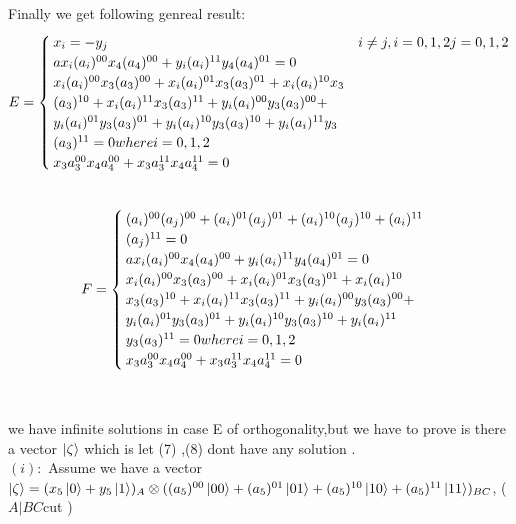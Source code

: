 \documentclass[a4paper,12pt]{article}
\begin{document}
Finally we get following genreal result:
\begin{equation}
E = \begin{cases}
x_{i}=-y_{j}        &  i\neq j   ,i=0,1,2   j=0,1,2\\
a x_{i}(a_{i})^{00}x_{4}(a_{4})^{00}+y_{i}(a_{i})^{11}y_{4}(a_{4})^{01}=0
\newline\\
x_{i}(a_{i})^{00}x_{3}(a_{3})^{00}+x_{i}(a_{i})^{01}x_{3}(a_{3})^{01}+x_{i}(a_{i})^{10}x_{3}\\
(a_{3})^{10}+x_{i}(a_{i})^{11}x_{3}(a_{3})^{11}+y_{i}(a_{i})^{00}y_{3}(a_{3})^{00}+\\
y_{i}(a_{i})^{01}y_{3}(a_{3})^{01}+y_{i}(a_{i})^{10}y_{3}(a_{3})^{10}+y_{i}(a_{i})^{11}y_{3}\\
(a_{3})^{11}=0  where i=0,1,2
\newline\\
x_{3}a_{3}^{00}x_{4}a_{4}^{00}+x_{3}a_{3}^{11}x_{4}a_{4}^{11}=0
\end{cases}
\end{equation}
\newline \\
\begin{equation}
F = \begin{cases}
(a_{i})^{00}(a_{j})^{00}+(a_{i})^{01}(a_{j})^{01}+(a_{i})^{10}(a_{j})^{10}+(a_{i})^{11}\\
(a_{j})^{11}=0
\newline \\
a x_{i}(a_{i})^{00}x_{4}(a_{4})^{00}+y_{i}(a_{i})^{11}y_{4}(a_{4})^{01}=0
\newline\\
x_{i}(a_{i})^{00}x_{3}(a_{3})^{00}+x_{i}(a_{i})^{01}x_{3}(a_{3})^{01}+x_{i}(a_{i})^{10}\\
x_{3}(a_{3})^{10}+x_{i}(a_{i})^{11}x_{3}(a_{3})^{11}+y_{i}(a_{i})^{00}y_{3}(a_{3})^{00}+\\
y_{i}(a_{i})^{01}y_{3}(a_{3})^{01}+y_{i}(a_{i})^{10}y_{3}(a_{3})^{10}+y_{i}(a_{i})^{11}\\
y_{3}(a_{3})^{11}=0  where i=0,1,2
\newline\\
x_{3}a_{3}^{00}x_{4}a_{4}^{00}+x_{3}a_{3}^{11}x_{4}a_{4}^{11}=0
\end{cases}
\end{equation}
\newline \\
\leavevmode
\newline \\
we have infinite solutions in case E of orthogonality,but we have to prove  is  there a vector  $\ket{\zeta}$ which is  let (7) ,(8) dont have  any solution .
\newline \\
$(i)    :$ Assume we have a vector $\ket{\zeta}=(x_{5}\ket{0}+y_{5}\ket{1})_{A}\otimes ((a_{5})^{00}\ket{00}+(a_{5})^{01}\ket{01}+(a_{5})^{10}\ket{10}+(a_{5})^{11}\ket{11})_{BC}$,   ( $      A|BC    $cut   )
\end{document}
